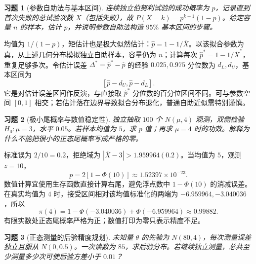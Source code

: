 \documentclass[12pt,fontset=fandol]{ctexart}
\newtheorem{exercise}{习题}[section]
\begin{document}
\begin{exercise}[参数自助法与基本区间]\label{q:M-PF-29}
连续独立伯努利试验的成功概率为 $p$，记录直到首次失败的总试验次数 $X$（包括失败），故 $P(X=k)=p^{k-1}(1-p)$。给定容量 $n$ 的样本，估计 $p$，并说明参数自助法构造 $95\%$ 基本区间的步骤。\par{}
\end{exercise}

\begin{solve}\label{a:M-PF-29}均值为 $1/(1-p)$，矩估计也是极大似然估计：$\widehat p=1-1/\overline X$。以该拟合参数为真，从上述几何分布模拟独立自助样本，容量仍为 $n$；计算每次 $\widehat p^*=1-1/\overline X^*$，重复足够多次。令估计误差 $\Delta^*=\widehat p^*-\widehat p$ 的经验 $0.025,0.975$ 分位数为 $d_L,d_U$，基本区间为\[[\widehat p-d_U,\widehat p-d_L].\]它是对估计误差区间作反演，与直接取 $\widehat p^*$ 分位数的百分位区间不同。可与参数空间 $[0,1]$ 相交；若估计落在边界导致拟合分布退化，普通自助近似需特别谨慎。\end{solve}

\begin{exercise}[极小尾概率与数值稳定性]\label{q:M-PF-30}
独立抽取 $100$ 个 $N(\mu,4)$ 观测，双侧检验 $H_0:\mu=3$，水平 $0.05$。若样本均值为 $5$，求 $p$ 值；再求 $\mu=4$ 时的功效。解释为什么不能把很小的正态尾概率写成严格的零。\par{}
\end{exercise}

\begin{solve}\label{a:M-PF-30}标准误为 $2/10=0.2$，拒绝域为 $|\overline X-3|>1.959964(0.2)$。当均值为 $5$，观测 $z=10$，\[p=2[1-\Phi(10)]\approx1.52397\times10^{-23}.\]数值计算宜使用生存函数直接计算右尾，避免浮点数中 $1-\Phi(10)$ 的消减误差。在真实均值为 $4$ 时，接受区间相对该均值标准化的两端为 $-6.959964,-3.040036$，所以\[\pi(4)=1-\Phi(-3.040036)+\Phi(-6.959964)\approx0.99882.\]有限实数处正态尾概率严格为正；数值打印为零只表示精度不足。\end{solve}

\begin{exercise}[正态测量的后验精度规划]\label{q:M-PF-31}
未知量 $\theta$ 的先验为 $N(80,4)$，每次测量误差独立且服从 $N(0,0.5)$。一次读数为 $85$，求后验分布。若继续独立测量，总共至少测量多少次可使后验方差小于 $0.01$？\par{}
\end{exercise}
\end{document}
